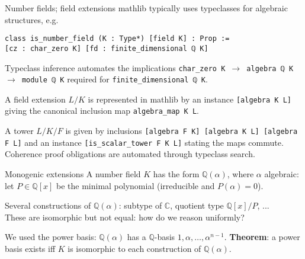 \documentclass{beamer}
\newcommand{\C}{\mathbb{C}}
\newcommand{\lean}[1]{\texttt{#1}\xspace}
\newcommand{\mathlib}{\textsf{mathlib}\xspace}
\newcommand{\Q}{\mathbb{Q}}
\newcommand{\Z}{\mathbb{Z}}
\DeclareMathOperator{\Frac}{Frac}
\begin{document}
\begin{frame}[fragile]{Number fields; field extensions}
	\mathlib typically uses typeclasses for algebraic structures, e.g.

\begin{lstlisting}
class is_number_field (K : Type*) [field K] : Prop :=
[cz : char_zero K] [fd : finite_dimensional ℚ K]
\end{lstlisting}

	Typeclass inference automates the implications \lean{char\_zero K $\to$ algebra ℚ K $\to$ module ℚ K}
	required for \lean{finite\_dimensional ℚ K}.

\pause

	A \alert{field extension} $L / K$ is represented in \mathlib by an instance \lean{[algebra K L]}
	giving the canonical inclusion map \lean{algebra\_map K L}.

\pause
	A tower $L / K / F$ is given by inclusions \lean{[algebra F K] [algebra K L] [algebra F L]}
	and an instance \lean{[is\_scalar\_tower F K L]} stating the maps commute.\\
	Coherence proof obligations are automated through typeclass search.
\end{frame}

%
%

\begin{frame}{Monogenic extensions}
	A number field $K$ has the form $\Q(\alpha)$, where $\alpha$ algebraic:\\
	let $P \in \Q[x]$ be the minimal polynomial (irreducible and $P(\alpha) = 0$).

	Several constructions of $\Q(\alpha)$: subtype of $\C$, quotient type $\Q[x] / P$, ...\\
	These are isomorphic but not equal: how do we reason uniformly?

\pause
	We used the \alert{power basis}: $\Q(\alpha)$ has a $\Q$-basis $1, \alpha, \dots, \alpha^{n - 1}$.
	\textbf{Theorem}: a power basis exists iff $K$ is isomorphic to each construction of $\Q(\alpha)$.
\end{frame}
\end{document}
